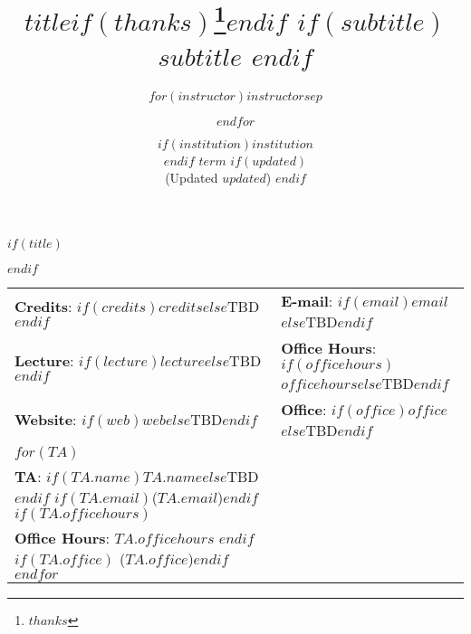 \documentclass[
  $if(fontsize)$
    $fontsize$,
  $else$
    12pt,
  $endif$
  $if(lang)$
    $babel-lang$,
  $endif$
  $if(papersize)$
    $papersize$,
  $endif$
  $for(classoption)$
    $classoption$ $sep$,
  $endfor$]{article}
\title{$title$$if(thanks)$\thanks{$thanks$}$endif$
         $if(subtitle)$ 
         \\ $subtitle$
         $endif$ 
         }
\author{$for(instructor)$$instructor$$sep$ \and $endfor$}
\date{$if(institution)$$institution$\\$endif$
      $term$ 
      $if(updated)$ \\[6pt] \normalsize (Updated $updated$) $endif$}
\begin{document}
  

 $if(title)$
 \maketitle
 $endif$
 
 
\thispagestyle{firststyle}



\begin{tabular*}{\textwidth}{ @{\extracolsep{\fill}} ll @{\extracolsep{\fill}}}

  \textbf{Credits}: $if(credits)$$credits$$else$TBD$endif$ &
    \textbf{E-mail}: $if(email)$\texttt{$email$}$else$TBD$endif$ \\

  \textbf{Lecture}: $if(lecture)$$lecture$$else$TBD$endif$ &
    \textbf{Office Hours}: $if(officehours)$$officehours$$else$TBD$endif$ \\

  \textbf{Website}: $if(web)$$web$$else$TBD$endif$ &
    \textbf{Office}: $if(office)$$office$$else$TBD$endif$ \\

    

  $for(TA)$
    \\[3pt]
    \textbf{TA}: $if(TA.name)$$TA.name$$else$TBD $endif$
                 $if(TA.email)$(\texttt{$TA.email$})$endif$
                 $if(TA.officehours)$ \\ \textbf{Office Hours}: $TA.officehours$ $endif$
                 $if(TA.office)$ ($TA.office$)$endif$
  $endfor$


 \end{tabular*}
 
\vspace{2mm}

\end{document}
